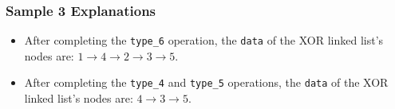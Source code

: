 \subsubsection{Sample 3 Explanations}\label{sample-3-explanation}

\begin{itemize}
\item After completing the \texttt{type\_6} operation, the \texttt{data} of the XOR linked list's nodes are: $1\rightarrow 4\rightarrow 2\rightarrow 3\rightarrow 5$. 
\item After completing the \texttt{type\_4} and \texttt{type\_5} operations, the \texttt{data} of the XOR linked list's nodes are: $4\rightarrow 3\rightarrow 5$.
\end{itemize}